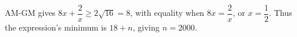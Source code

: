 AM-GM gives $ 8x+\dfrac{2}{x}\ge2\sqrt{16}=8 $, with equality when $ 8x=\dfrac{2}{x}$, or $ x=\dfrac{1}{2}$. Thus the expression's minimum is $ 18+n $, giving $\boxed{n=2000}$.
